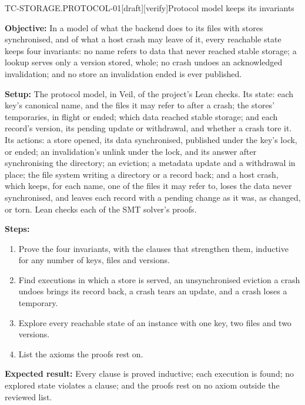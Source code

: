 \begin{requirement}{TC-STORAGE.PROTOCOL-01}[draft][verify]{Protocol model keeps its invariants}


  \textbf{Objective:} In a model of what the backend does to its files with
  stores synchronised, and of what a host crash may leave of it, every
  reachable state keeps four invariants: no name refers to data that never
  reached stable storage; a lookup serves only a version stored, whole; no
  crash undoes an acknowledged invalidation; and no store an invalidation
  ended is ever published.

  \textbf{Setup:} The protocol model, in Veil, of the project's Lean checks.
  Its state: each key's canonical name, and the files it may refer to after
  a crash; the stores' temporaries, in flight or ended; which data reached
  stable storage; and each record's version, its pending update or
  withdrawal, and whether a crash tore it. Its actions: a store opened, its
  data synchronised, published under the key's lock, or ended; an
  invalidation's unlink under the lock, and its answer after synchronising
  the directory; an eviction; a metadata update and a withdrawal in place;
  the file system writing a directory or a record back; and a host crash,
  which keeps, for each name, one of the files it may refer to, loses the
  data never synchronised, and leaves each record with a pending change as
  it was, as changed, or torn. Lean checks each of the SMT solver's proofs.

  \textbf{Steps:}
  \begin{enumerate}
    \item Prove the four invariants, with the clauses that strengthen them,
      inductive for any number of keys, files and versions.
    \item Find executions in which a store is served, an unsynchronised
      eviction a crash undoes brings its record back, a crash tears an
      update, and a crash loses a temporary.
    \item Explore every reachable state of an instance with one key, two
      files and two versions.
    \item List the axioms the proofs rest on.
  \end{enumerate}

  \textbf{Expected result:} Every clause is proved inductive; each
  execution is found; no explored state violates a clause; and the proofs
  rest on no axiom outside the reviewed list.



\end{requirement}
